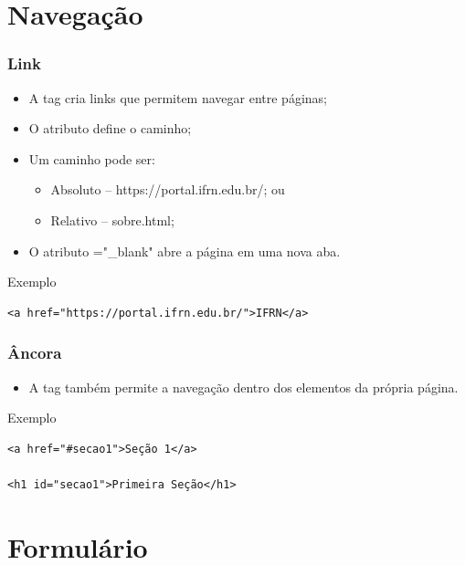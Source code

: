 \documentclass[aspectratio=169]{beamer} %
\begin{document}
\section{Navegação}

\begin{frame}[fragile]
	\frametitle{Link}
	
	\begin{itemize}
		\item A tag  cria links que permitem navegar entre páginas;
		\item O atributo  define o caminho;
		\item Um caminho pode ser:
		\begin{itemize}
			\item Absoluto -- https://portal.ifrn.edu.br/; ou
			\item Relativo -- sobre.html;
		\end{itemize}
		\item O atributo ="\_blank" abre a página em uma nova aba.
	\end{itemize}\vfill
	
	\begin{exampleblock}{Exemplo}
		\begin{lstlisting}
<a href="https://portal.ifrn.edu.br/">IFRN</a>
		\end{lstlisting}
	\end{exampleblock}
\end{frame}

\begin{frame}[fragile]
	\frametitle{Âncora}
	
	\begin{itemize}
		\item A tag  também permite a navegação dentro dos elementos da própria página.
	\end{itemize}\vfill
	
	\begin{exampleblock}{Exemplo}
		\begin{lstlisting}
<a href="#secao1">Seção 1</a>

<h1 id="secao1">Primeira Seção</h1>
		\end{lstlisting}
	\end{exampleblock}
\end{frame}

\section{Formulário}
\end{document}
